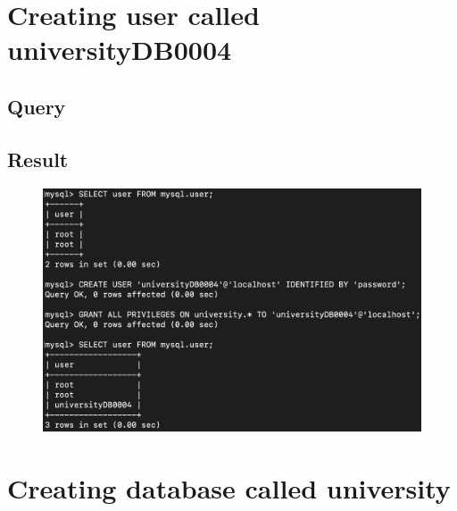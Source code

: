 \documentclass[12pt]{article}
\begin{document}
\begin{titlingpage}
\maketitle
\end{titlingpage}

\newpage

\section{Creating user called universityDB0004}

\subsection{Query}

\subsection{Result}
\begin{figure}[!hbt]
    \centering
    \includegraphics[scale=0.6]{screenshots/1.png}
    \label{fig:my_label1}
\end{figure}

\newpage

\section{Creating database called university}
\end{document}
